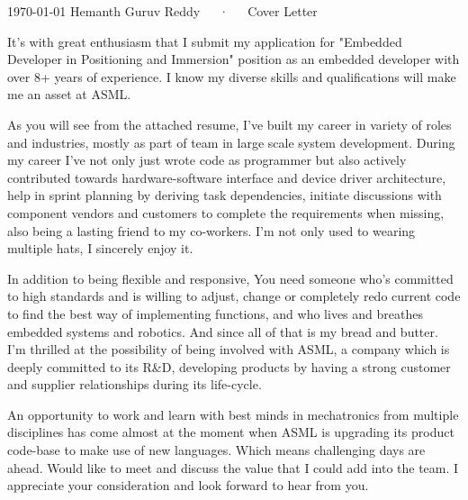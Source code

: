 \documentclass[11pt, a4paper]{awesome-cv}
\begin{document}
\makecvheader[C]

\makecvfooter
  {\today}
  {Hemanth Guruv Reddy~~~·~~~Cover Letter}
  {}

\makelettertitle

\begin{cvletter}

It's with great enthusiasm that I submit my application for "Embedded Developer in Positioning and Immersion" position as an embedded developer with over 8+ years of experience. I know my diverse skills and qualifications will make me an asset at ASML.

As you will see from the attached resume, I've built my career in variety of roles and industries, mostly as part of team in large scale system development. During my career I've not only just wrote code as programmer but also actively contributed towards hardware-software interface and device driver architecture, help in sprint planning by deriving task dependencies, initiate discussions with component vendors and customers to complete the requirements when missing, also being a lasting friend to my co-workers. I'm not only used to wearing multiple hats, I sincerely enjoy it.

In addition to being flexible and responsive, You need someone who's committed to high standards and is willing to adjust, change or completely redo current code to find the best way of implementing functions, and who lives and breathes embedded systems and robotics. And since all of that is my bread and butter. I'm thrilled at the possibility of being involved with ASML, a company which is deeply committed to its R\&D, developing products by having a strong customer and supplier relationships during its life-cycle. 

An opportunity to work and learn with best minds in mechatronics from multiple disciplines has come almost at the moment when ASML is upgrading its product code-base to make use of new languages. Which means challenging days are ahead. Would like to meet and discuss the value that I could add into the team. I appreciate your consideration and look forward to hear from you.

\end{cvletter}


\makeletterclosing
\end{document}
